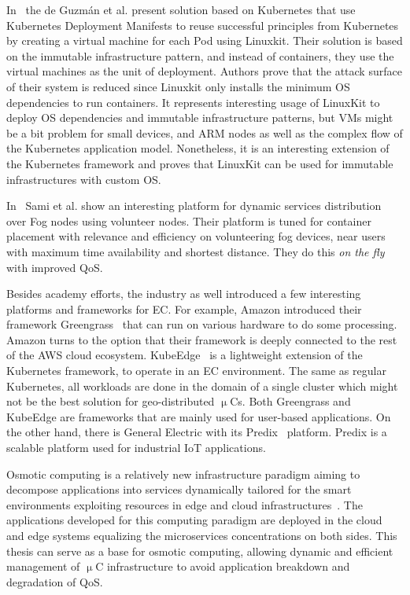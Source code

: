 In~\cite{abs-1802-10375} the de Guzm{\'{a}}n et al. present solution based on Kubernetes that use Kubernetes Deployment Manifests to reuse successful principles from Kubernetes by creating a virtual machine for each Pod using Linuxkit. Their solution is based on the immutable infrastructure pattern, and instead of containers, they use the virtual machines as the unit of deployment. Authors prove that the attack surface of their system is reduced since Linuxkit only installs the minimum OS dependencies to run containers. It represents interesting usage of LinuxKit to deploy OS dependencies and immutable infrastructure patterns, but VMs might be a bit problem for small devices, and ARM nodes as well as the complex flow of the Kubernetes application model. Nonetheless, it is an interesting extension of the Kubernetes framework and proves that LinuxKit can be used for immutable infrastructures with custom OS.

In~\cite{SamiM20} Sami et al. show an interesting platform for dynamic services distribution over Fog nodes using volunteer nodes. Their platform is tuned for container placement with relevance and efficiency on volunteering fog devices, near users with maximum time availability and shortest distance. They do this \textit{on the fly}  with improved QoS.

Besides academy efforts, the industry as well introduced a few interesting platforms and frameworks for EC. For example, Amazon introduced their framework Greengrass~\cite{kurniawan_2018} that can run on various hardware to do some processing. Amazon turns to the option that their framework is deeply connected to the rest of the AWS cloud ecosystem.  KubeEdge~\cite{KubeEdge} is a lightweight extension of the Kubernetes framework, to operate in an EC environment. The same as regular Kubernetes, all workloads are done in the domain of a single cluster which might not be the best solution for geo-distributed $\upmu$Cs. Both Greengrass and KubeEdge are frameworks that are mainly used for user-based applications. On the other hand, there is General Electric with its Predix~\cite{GE_Predix} platform. Predix is a scalable platform used for industrial IoT applications.

Osmotic computing is a relatively new infrastructure paradigm aiming to decompose applications into services dynamically tailored for the smart environments exploiting resources in edge and cloud infrastructures~\cite{VillariFDRJR19}. The applications developed for this computing paradigm are deployed in the cloud and edge systems equalizing the microservices concentrations on both sides. This thesis can serve as a base for osmotic computing, allowing dynamic and efficient management of $\upmu$C infrastructure to avoid application breakdown and degradation of QoS.
%
%
